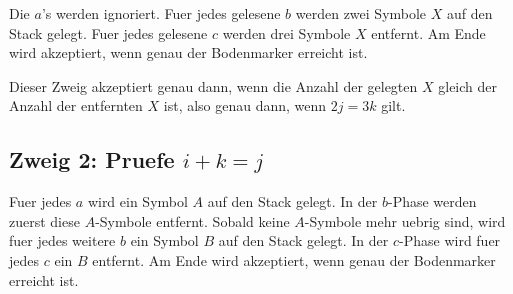 \documentclass[a4paper,12pt,fleqn]{article}
\begin{document}
Die $a$'s werden ignoriert. Fuer jedes gelesene $b$ werden zwei Symbole $X$ auf den Stack gelegt. Fuer
jedes gelesene $c$ werden drei Symbole $X$ entfernt. Am Ende wird akzeptiert, wenn genau der
Bodenmarker erreicht ist.

\begin{center}
\end{center}

Dieser Zweig akzeptiert genau dann, wenn die Anzahl der gelegten $X$ gleich der Anzahl der entfernten
$X$ ist, also genau dann, wenn $2j=3k$ gilt.

\subsection*{Zweig 2: Pruefe $i+k=j$}

Fuer jedes $a$ wird ein Symbol $A$ auf den Stack gelegt. In der $b$-Phase werden zuerst diese
$A$-Symbole entfernt. Sobald keine $A$-Symbole mehr uebrig sind, wird fuer jedes weitere $b$ ein
Symbol $B$ auf den Stack gelegt. In der $c$-Phase wird fuer jedes $c$ ein $B$ entfernt. Am Ende wird
akzeptiert, wenn genau der Bodenmarker erreicht ist.
\end{document}
